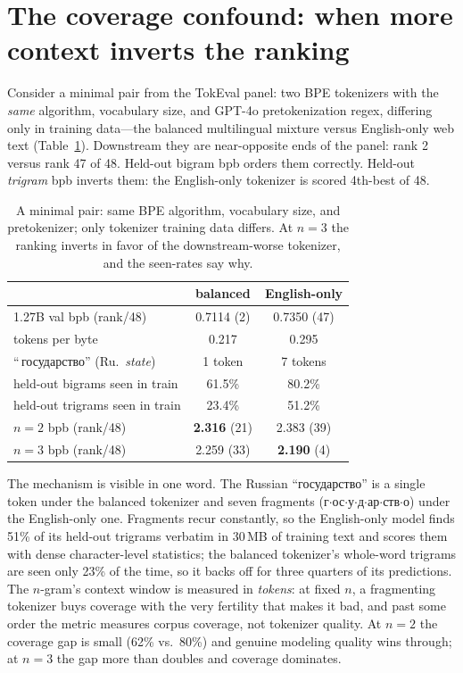\documentclass[10pt,twocolumn]{article}
\begin{document}
\section{The coverage confound: when more context inverts the ranking}
Consider a minimal pair from the TokEval panel: two BPE tokenizers with the \emph{same} algorithm, vocabulary size, and GPT-4o pretokenization regex, differing only in training data---the balanced multilingual mixture versus English-only web text (Table~\ref{tab:pair}). Downstream they are near-opposite ends of the panel: rank 2 versus rank 47 of 48. Held-out bigram bpb orders them correctly. Held-out \emph{trigram} bpb inverts them: the English-only tokenizer is scored 4th-best of 48.

\begin{table}[t]\centering\small
\begin{tabular}{lcc}
\toprule
 & balanced & English-only \\
\midrule
1.27B val bpb (rank/48) & 0.7114 (2) & 0.7350 (47) \\
tokens per byte & 0.217 & 0.295 \\
\foreignlanguage{russian}{``\,государство''} (Ru.\ \emph{state}) & 1 token & 7 tokens \\
held-out bigrams seen in train & 61.5\% & 80.2\% \\
held-out trigrams seen in train & 23.4\% & 51.2\% \\
$n{=}2$ bpb (rank/48) & \textbf{2.316} (21) & 2.383 (39) \\
$n{=}3$ bpb (rank/48) & 2.259 (33) & \textbf{2.190} (4) \\
\bottomrule
\end{tabular}
\caption{A minimal pair: same BPE algorithm, vocabulary size, and pretokenizer; only tokenizer training data differs. At $n{=}3$ the ranking inverts in favor of the downstream-worse tokenizer, and the seen-rates say why.}
\label{tab:pair}
\end{table}

The mechanism is visible in one word. The Russian \foreignlanguage{russian}{``государство''} is a single token under the balanced tokenizer and seven fragments (\foreignlanguage{russian}{г$\cdot$ос$\cdot$у$\cdot$д$\cdot$ар$\cdot$ств$\cdot$о}) under the English-only one. Fragments recur constantly, so the English-only model finds 51\% of its held-out trigrams verbatim in 30\,MB of training text and scores them with dense character-level statistics; the balanced tokenizer's whole-word trigrams are seen only 23\% of the time, so it backs off for three quarters of its predictions. The $n$-gram's context window is measured in \emph{tokens}: at fixed $n$, a fragmenting tokenizer buys coverage with the very fertility that makes it bad, and past some order the metric measures corpus coverage, not tokenizer quality. At $n{=}2$ the coverage gap is small (62\% vs.\ 80\%) and genuine modeling quality wins through; at $n{=}3$ the gap more than doubles and coverage dominates.
\end{document}
